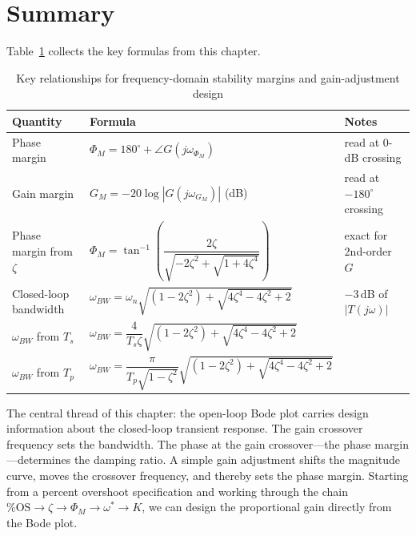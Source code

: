 \documentclass[12pt]{article}
\begin{document}
\section{Summary}
\label{sec:summary}

Table~\ref{tab:summary} collects the key formulas from this chapter.

\begin{table}[htbp]
  \centering
  \caption{Key relationships for frequency-domain stability margins and gain-adjustment design}
  \label{tab:summary}
  \renewcommand{\arraystretch}{1.6}
  \begin{tabular}{@{}p{3.8cm}p{6.5cm}p{3.2cm}@{}}
    \toprule
    Quantity & Formula & Notes \\
    \midrule
    Phase margin
      & $\Phi_M = 180^\circ + \angle G(j\omega_{\Phi_M})$
      & read at 0-dB crossing \\
    Gain margin
      & $G_M = -20\log|G(j\omega_{G_M})|$ (dB)
      & read at $-180^\circ$ crossing \\
    Phase margin from $\zeta$
      & $\Phi_M = \tan^{-1}\!\!\left(\dfrac{2\zeta}{\sqrt{-2\zeta^2+\sqrt{1+4\zeta^4}}}\right)$
      & exact for 2nd-order $G$ \\
    Closed-loop bandwidth
      & $\omega_{BW} = \omega_n\sqrt{(1-2\zeta^2)+\sqrt{4\zeta^4-4\zeta^2+2}}$
      & $-3$\,dB of $|T(j\omega)|$ \\
    $\omega_{BW}$ from $T_s$
      & $\omega_{BW} = \dfrac{4}{T_s\zeta}\sqrt{(1-2\zeta^2)+\sqrt{4\zeta^4-4\zeta^2+2}}$
      & \\
    $\omega_{BW}$ from $T_p$
      & $\omega_{BW} = \dfrac{\pi}{T_p\sqrt{1-\zeta^2}}\sqrt{(1-2\zeta^2)+\sqrt{4\zeta^4-4\zeta^2+2}}$
      & \\
    \bottomrule
  \end{tabular}
\end{table}

The central thread of this chapter: the open-loop Bode plot carries design
information about the closed-loop transient response.  The gain crossover
frequency sets the bandwidth.  The phase at the gain crossover---the phase
margin---determines the damping ratio.  A simple gain adjustment shifts the
magnitude curve, moves the crossover frequency, and thereby sets the phase
margin.  Starting from a percent overshoot specification and working through
the chain $\text{\%OS} \to \zeta \to \Phi_M \to \omega^* \to K$, we can
design the proportional gain directly from the Bode plot.
\end{document}
